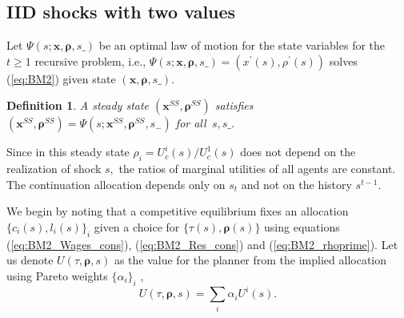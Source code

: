 \documentclass[thmsb,11pt]{article}
\newtheorem{definition}{Definition}
\begin{document}
\subsection{IID shocks with two values}
Let $\Psi \left( s;\bm{x},\bm{\rho },s\_\right) $ be an optimal  law of motion for the state variables
for the $t\geq1$ recursive problem, i.e., $\Psi \left( s;\bm{x},%
\bm{\rho },s\_\right) =\left( x^{\prime }\left( s\right) ,\rho ^{\prime
}\left( s\right) \right) $  solves (\ref{eq:BM2}) given state $\left(
\bm{x},\bm{\rho },s\_\right) .$
\begin{definition}
 A steady state  $\left( \bm{x}^{SS},\bm{\rho} ^{SS}\right) $  satisfies $\left(\bm{ x}^{SS},\bm{\rho}
^{SS}\right) =\Psi \left( s;\bm{x}^{SS},\bm{\rho} ^{SS},s_{-}\right) $ for all $%
\,s,s\_.$
\end{definition}
Since in this steady state $\rho_i =U_{c}^{i}(s)/U_{c}^{1}(s)$ does
not depend on the realization of shock $s,$ the ratios of marginal utilities
of  all agents are constant. The continuation allocation depends only on  $s_{t}$ and not on the  history $s^{t-1}$.%

We  begin by noting that a competitive equilibrium fixes an allocation $\{c_i(s),l_i(s)\}_{i}$ given a choice for $\{\tau(s), \bm{\rho}(s)\}$ using equations (\ref{eq:BM2_Wages_cons}), (\ref{eq:BM2_Res_cons}) and (\ref{eq:BM2_rhoprime}).  Let us denote $U(\tau,\bm{\rho},s)$ as the value for the planner from the implied allocation using Pareto weights $\{\alpha_i\}_i$ ,
\[U(\tau,\bm{\rho},s)=\sum_{i}\alpha_i U^i(s).\]
\end{document}
